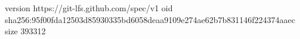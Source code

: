 version https://git-lfs.github.com/spec/v1
oid sha256:95f00fda12503d85930335bd6058deaa9109e274ae62b7b831146f224374aaec
size 393312
